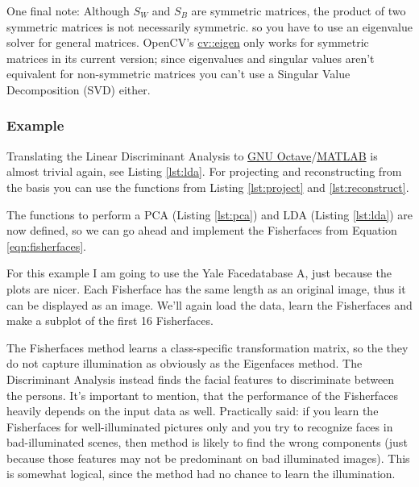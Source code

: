 One final note: Although $S_{W}$ and $S_{B}$ are symmetric matrices, the product of two symmetric matrices is not necessarily symmetric. so you have to use an eigenvalue solver for general matrices. OpenCV's \href{http://opencv.willowgarage.com/documentation/cpp/operations_on_arrays.html#cv-eigen}{cv::eigen} only works for symmetric matrices in its current version; since eigenvalues and singular values aren't equivalent for non-symmetric matrices you can't use a Singular Value Decomposition (SVD) either.

\subsubsection{Example}

\label{ssection:example_fisherfaces}

Translating the Linear Discriminant Analysis to \href{http://www.gnu.org/software/octave/}{GNU Octave}/\href{http://www.mathworks.com}{MATLAB} is almost trivial again, see Listing \ref{lst:lda}. For projecting and reconstructing from the basis you can use the functions from Listing \ref{lst:project} and \ref{lst:reconstruct}.



The functions to perform a PCA (Listing \ref{lst:pca}) and LDA (Listing \ref{lst:lda}) are now defined, so we can go ahead and implement the Fisherfaces from Equation \ref{eqn:fisherfaces}. 



For this example I am going to use the Yale Facedatabase A, just because the plots are nicer. Each Fisherface has the same length as an original image, thus it can be displayed as an image. We'll again load the data, learn the Fisherfaces and make a subplot of the first 16 Fisherfaces.



The Fisherfaces method learns a class-specific transformation matrix, so the they do not capture illumination as obviously as the Eigenfaces method. The Discriminant Analysis instead finds the facial features to discriminate between the persons. It's important to mention, that the performance of the Fisherfaces heavily depends on the input data as well. Practically said: if you learn the Fisherfaces for well-illuminated pictures only and you try to recognize faces in bad-illuminated scenes, then method is likely to find the wrong components (just because those features may not be predominant on bad illuminated images). This is somewhat logical, since the method had no chance to learn the illumination.

